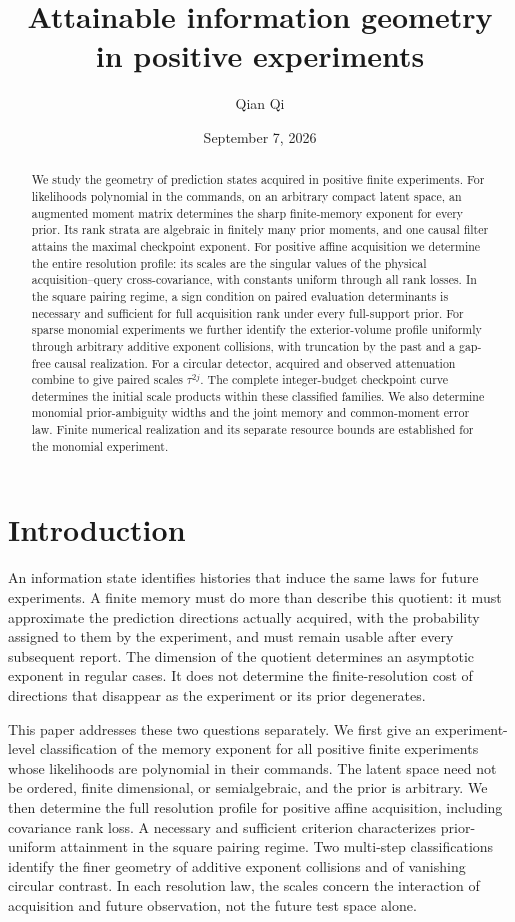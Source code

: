 \documentclass[11pt]{amsart}
\title[Attainable information geometry]{Attainable information geometry\\ in positive experiments}
\author{Qian Qi}
\date{September 7, 2026}
\theoremstyle{definition}\newtheorem{definition}[theorem]{Definition}
\theoremstyle{remark}\newtheorem{remark}[theorem]{Remark}
\begin{document}
\begin{abstract}
We study the geometry of prediction states acquired in positive finite
experiments. For likelihoods polynomial in the commands, on an arbitrary
compact latent space, an augmented moment matrix determines the sharp
finite-memory exponent for every prior. Its rank strata are algebraic
in finitely many prior moments, and one causal filter attains the maximal
checkpoint exponent. For positive affine acquisition we determine the
entire resolution profile: its scales are the singular values of the
physical acquisition--query cross-covariance, with constants uniform
through all rank losses. In the square pairing regime, a sign condition
on paired evaluation determinants is necessary and sufficient for full
acquisition rank under every full-support prior. For sparse monomial
experiments we further identify the exterior-volume profile uniformly
through arbitrary additive exponent collisions, with truncation by the
past and a gap-free causal realization. For a circular detector, acquired
and observed attenuation combine to give paired scales $\tau^{2j}$.
The complete integer-budget checkpoint curve determines the initial
scale products within these classified families. We also determine
monomial prior-ambiguity widths and the joint memory and common-moment
error law. Finite numerical realization and its separate resource bounds
are established for the monomial experiment.
\end{abstract}
\maketitle
\section{Introduction}
An information state identifies histories that induce the same laws for
future experiments. A finite memory must do more than describe this
quotient: it must approximate the prediction directions actually
acquired, with the probability assigned to them by the experiment, and
must remain usable after every subsequent report. The dimension of the
quotient determines an asymptotic exponent in regular cases. It does
not determine the finite-resolution cost of directions that disappear
as the experiment or its prior degenerates.

This paper addresses these two questions separately. We first give an
experiment-level classification of the memory exponent for all positive
finite experiments whose likelihoods are polynomial in their commands.
The latent space need not be ordered, finite dimensional, or
semialgebraic, and the prior is arbitrary. We then determine the full
resolution profile for positive affine acquisition, including covariance
rank loss. A necessary and sufficient criterion characterizes
prior-uniform attainment in the square pairing regime. Two multi-step
classifications identify the finer geometry of additive exponent
collisions and of vanishing circular contrast. In each resolution law,
the scales concern the interaction of acquisition and future observation,
not the future test space alone.
\end{document}
